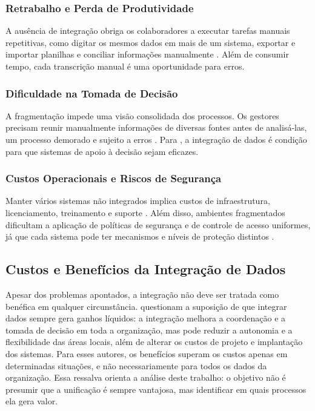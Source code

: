 \subsubsection{Retrabalho e Perda de Produtividade}

A ausência de integração obriga os colaboradores a executar tarefas manuais repetitivas, como digitar os mesmos dados em mais de um sistema, exportar e importar planilhas e conciliar informações manualmente \citep{stair2018}. Além de consumir tempo, cada transcrição manual é uma oportunidade para erros.

\subsubsection{Dificuldade na Tomada de Decisão}

A fragmentação impede uma visão consolidada dos processos. Os gestores precisam reunir manualmente informações de diversas fontes antes de analisá-las, um processo demorado e sujeito a erros \citep{power2002}. Para \citet{sharda2014}, a integração de dados é condição para que sistemas de apoio à decisão sejam eficazes.

\subsubsection{Custos Operacionais e Riscos de Segurança}

Manter vários sistemas não integrados implica custos de infraestrutura, licenciamento, treinamento e suporte \citep{turban2010}. Além disso, ambientes fragmentados dificultam a aplicação de políticas de segurança e de controle de acesso uniformes, já que cada sistema pode ter mecanismos e níveis de proteção distintos \citep{whitman2018}.

\subsection{Custos e Benefícios da Integração de Dados}

Apesar dos problemas apontados, a integração não deve ser tratada como benéfica em qualquer circunstância. \citet{goodhue1992} questionam a suposição de que integrar dados sempre gera ganhos líquidos: a integração melhora a coordenação e a tomada de decisão em toda a organização, mas pode reduzir a autonomia e a flexibilidade das áreas locais, além de alterar os custos de projeto e implantação dos sistemas. Para esses autores, os benefícios superam os custos apenas em determinadas situações, e não necessariamente para todos os dados da organização. Essa ressalva orienta a análise deste trabalho: o objetivo não é presumir que a unificação é sempre vantajosa, mas identificar em quais processos ela gera valor.

